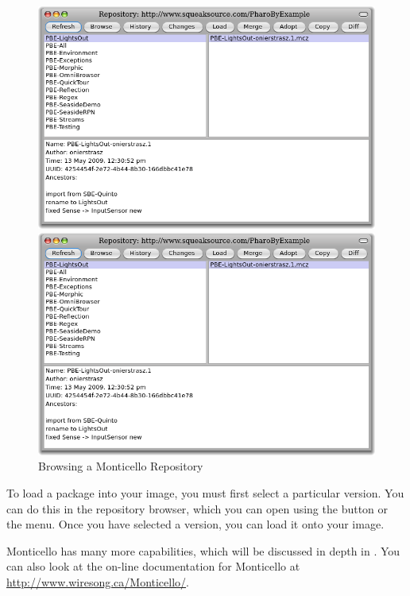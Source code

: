 \documentclass[a4paper,10pt,twoside]{book}
\begin{document}
\begin{figure}[hbt]
\ifluluelse
	{\centerline {\includegraphics[width=\textwidth]{BrowseRepository}}}
	{\centerline {\includegraphics[scale=0.7]{BrowseRepository}}}
\caption{Browsing a Monticello Repository
\label{fig:monticello3}}
\end{figure}


To load a package into your image, you must first select a particular version.  You can do this in the repository browser, which you can open using the  button or the \actclick menu.  Once you have selected a version, you can load it onto your image.


Monticello has many more capabilities, which will be discussed in depth in .
You can also look at the on-line documentation for Monticello at \url{http://www.wiresong.ca/Monticello/}.
\end{document}
